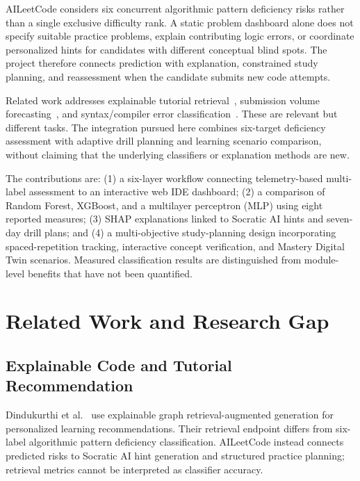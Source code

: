 \documentclass[conference]{IEEEtran}
\begin{document}
AILeetCode considers six concurrent algorithmic pattern deficiency risks rather than a single exclusive difficulty rank. A static problem dashboard alone does not specify suitable practice problems, explain contributing logic errors, or coordinate personalized hints for candidates with different conceptual blind spots. The project therefore connects prediction with explanation, constrained study planning, and reassessment when the candidate submits new code attempts.

Related work addresses explainable tutorial retrieval~\cite{dindukurthi2026explainable}, submission volume forecasting~\cite{abdullah2026leakage}, and syntax/compiler error classification~\cite{reik2023genetic}. These are relevant but different tasks. The integration pursued here combines six-target deficiency assessment with adaptive drill planning and learning scenario comparison, without claiming that the underlying classifiers or explanation methods are new.

The contributions are: (1) a six-layer workflow connecting telemetry-based multi-label assessment to an interactive web IDE dashboard; (2) a comparison of Random Forest, XGBoost, and a multilayer perceptron (MLP) using eight reported measures; (3) SHAP explanations linked to Socratic AI hints and seven-day drill plans; and (4) a multi-objective study-planning design incorporating spaced-repetition tracking, interactive concept verification, and Mastery Digital Twin scenarios. Measured classification results are distinguished from module-level benefits that have not been quantified.

\section{Related Work and Research Gap}

\subsection{Explainable Code and Tutorial Recommendation}
Dindukurthi et al.~\cite{dindukurthi2026explainable} use explainable graph retrieval-augmented generation for personalized learning recommendations. Their retrieval endpoint differs from six-label algorithmic pattern deficiency classification. AILeetCode instead connects predicted risks to Socratic AI hint generation and structured practice planning; retrieval metrics cannot be interpreted as classifier accuracy.
\end{document}
